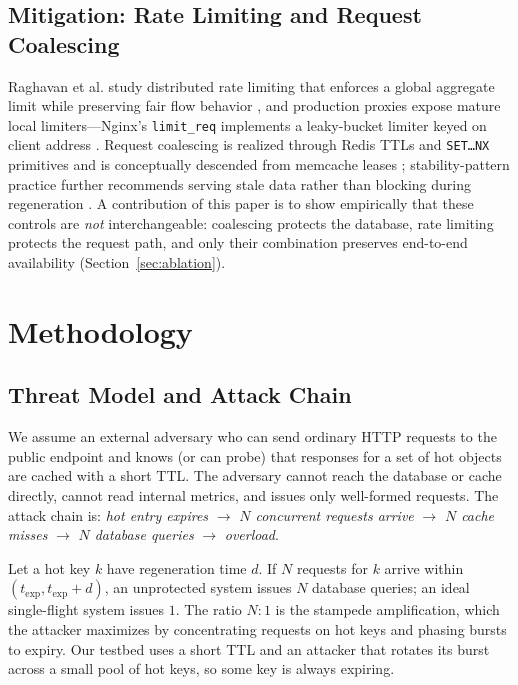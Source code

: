 \documentclass[conference]{IEEEtran}
\begin{document}
\subsection{Mitigation: Rate Limiting and Request Coalescing}
Raghavan et al. study distributed rate limiting that enforces a global aggregate limit
while preserving fair flow behavior \cite{raghavan2007}, and production proxies expose
mature local limiters---Nginx's \texttt{limit\_req} implements a leaky-bucket limiter
keyed on client address \cite{nginxlimitreq}. Request coalescing is realized through
Redis TTLs and \texttt{SET\ldots NX} primitives \cite{redisdocs} and is conceptually
descended from memcache leases \cite{nishtala2013}; stability-pattern practice further
recommends serving stale data rather than blocking during regeneration
\cite{nygard2018}. A contribution of this paper is to show empirically that these
controls are \emph{not} interchangeable: coalescing protects the database, rate
limiting protects the request path, and only their combination preserves end-to-end
availability (Section~\ref{sec:ablation}).

\section{Methodology}
\subsection{Threat Model and Attack Chain}
We assume an external adversary who can send ordinary HTTP requests to the public
endpoint and knows (or can probe) that responses for a set of hot objects are cached
with a short TTL. The adversary cannot reach the database or cache directly, cannot
read internal metrics, and issues only well-formed requests. The attack chain is:
\emph{hot entry expires} $\rightarrow$ \emph{$N$ concurrent requests arrive}
$\rightarrow$ \emph{$N$ cache misses} $\rightarrow$ \emph{$N$ database queries}
$\rightarrow$ \emph{overload}.

Let a hot key $k$ have regeneration time $d$. If $N$ requests for $k$ arrive within
$(t_{\mathrm{exp}}, t_{\mathrm{exp}}+d)$, an unprotected system issues $N$ database
queries; an ideal single-flight system issues $1$. The ratio $N{:}1$ is the stampede
amplification, which the attacker maximizes by concentrating requests on hot keys and
phasing bursts to expiry. Our testbed uses a short TTL and an attacker that rotates
its burst across a small pool of hot keys, so some key is always expiring.
\end{document}
